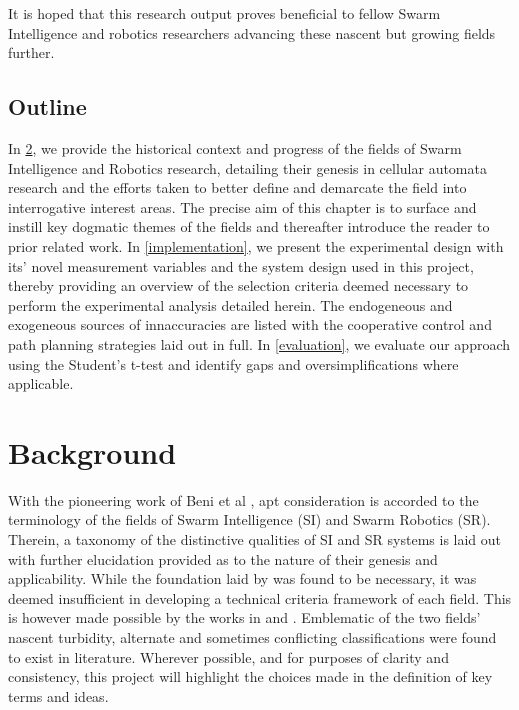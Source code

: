 \documentclass{report}
\begin{document}
It is hoped that this research output proves beneficial to fellow Swarm Intelligence and robotics researchers advancing these nascent but growing fields further.

\section{Outline}

In \ref{background}, we provide the historical context and progress of the fields of Swarm Intelligence and Robotics research, detailing their genesis in cellular automata research and the efforts taken to better define and demarcate the field into interrogative interest areas. The precise aim of this chapter is to surface and instill key dogmatic themes of the fields and thereafter introduce the reader to prior related work.  In \ref{implementation}, we present the experimental design with its' novel measurement variables and the system design used in this project, thereby providing an overview of the selection criteria deemed necessary to perform the experimental analysis detailed herein. The endogeneous and exogeneous sources of innaccuracies are listed with the cooperative control and path planning strategies laid out in full. In \ref{evaluation}, we evaluate our approach using the Student's t-test \cite{Kennedy1995} and identify gaps and oversimplifications where applicable.

\chapter{Background} \label{background}
With the pioneering work of Beni et al \cite{Beni2005a}, apt consideration is accorded to the terminology of the fields of Swarm Intelligence (SI) and Swarm Robotics (SR). Therein, a taxonomy of the distinctive qualities of SI and SR systems is laid out with further elucidation provided as to the nature of their genesis and applicability. While the foundation laid by \cite{Beni2005a} was found to be necessary, it was deemed insufficient in developing a technical criteria framework of each field. This is however made possible by the works in \cite{Iocchi2001} and \cite{Sahin2005}. Emblematic of the two fields' nascent turbidity, alternate and sometimes conflicting classifications were found \cite{Tan2013} to exist in literature. Wherever possible, and for purposes of clarity and consistency, this project will highlight the choices made in the definition of key terms and ideas.
\end{document}
